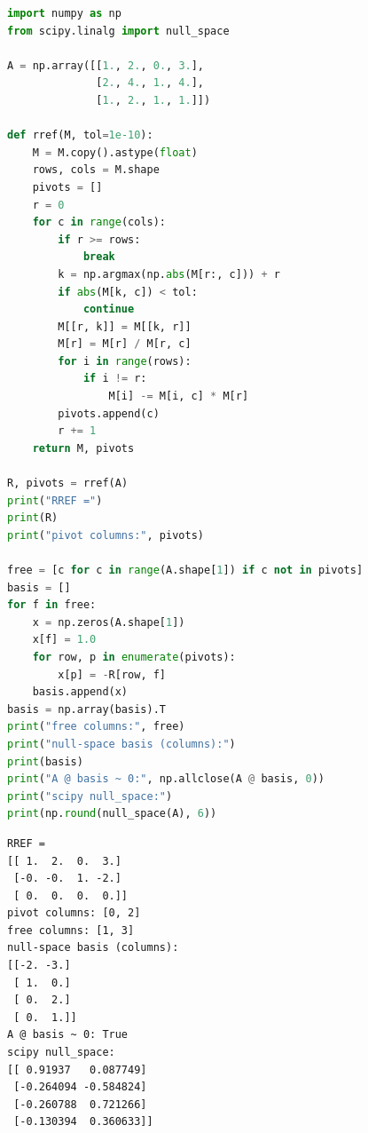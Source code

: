 \begin{lstlisting}[language=Python,caption={RREF by hand then read off a null-space basis, checked against \texttt{scipy.linalg.null\_space}. File: \texttt{code/ch03\_null\_space\_basis.py}.},label={lst:nullspace}]
import numpy as np
from scipy.linalg import null_space

A = np.array([[1., 2., 0., 3.],
              [2., 4., 1., 4.],
              [1., 2., 1., 1.]])

def rref(M, tol=1e-10):
    M = M.copy().astype(float)
    rows, cols = M.shape
    pivots = []
    r = 0
    for c in range(cols):
        if r >= rows:
            break
        k = np.argmax(np.abs(M[r:, c])) + r
        if abs(M[k, c]) < tol:
            continue
        M[[r, k]] = M[[k, r]]
        M[r] = M[r] / M[r, c]
        for i in range(rows):
            if i != r:
                M[i] -= M[i, c] * M[r]
        pivots.append(c)
        r += 1
    return M, pivots

R, pivots = rref(A)
print("RREF =")
print(R)
print("pivot columns:", pivots)

free = [c for c in range(A.shape[1]) if c not in pivots]
basis = []
for f in free:
    x = np.zeros(A.shape[1])
    x[f] = 1.0
    for row, p in enumerate(pivots):
        x[p] = -R[row, f]
    basis.append(x)
basis = np.array(basis).T
print("free columns:", free)
print("null-space basis (columns):")
print(basis)
print("A @ basis ~ 0:", np.allclose(A @ basis, 0))
print("scipy null_space:")
print(np.round(null_space(A), 6))
\end{lstlisting}

\begin{lstlisting}[caption={Output of listing~\ref{lst:nullspace}. Our RREF basis is different from SciPy's — both are correct: a basis is not unique. SciPy returns an \emph{orthonormal} one (Chapter 7); ours is exact integers off the RREF.}]
RREF =
[[ 1.  2.  0.  3.]
 [-0. -0.  1. -2.]
 [ 0.  0.  0.  0.]]
pivot columns: [0, 2]
free columns: [1, 3]
null-space basis (columns):
[[-2. -3.]
 [ 1.  0.]
 [ 0.  2.]
 [ 0.  1.]]
A @ basis ~ 0: True
scipy null_space:
[[ 0.91937   0.087749]
 [-0.264094 -0.584824]
 [-0.260788  0.721266]
 [-0.130394  0.360633]]
\end{lstlisting}


